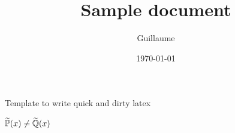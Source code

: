 \documentclass{article}
\title{Sample document}
\author{Guillaume}
\date{\today}
\begin{document}
\maketitle

Template to write quick and dirty latex

$\widetilde{\mathbb{P}}(x) \neq \widetilde{\mathbb{Q}}(x)$
\end{document}

